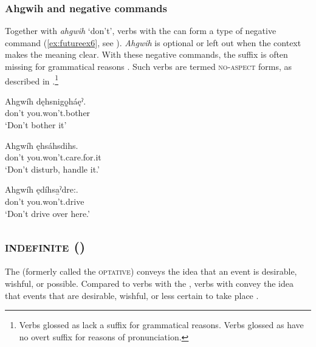 \z
\z


\subsubsection*{Ahgwih  {\future} and negative commands} \label{[ahgwih ę-] future and negative commands}
Together with \textit{ahgwih} ‘don’t’, verbs with the   {\future} can form a type of negative command (\ref{ex:futureex6}, see ). \textit{Ahgwih} is optional or left out when the context makes the meaning clear. With these negative commands, the  {\punctual} suffix is often missing for grammatical reasons . Such verbs are termed \textsc{no-aspect} forms, as described in .\footnote{Verbs glossed as {\noaspect} lack a  {\punctual} suffix for grammatical reasons. Verbs glossed as {\zeropunctual} have no overt  {\punctual} suffix for reasons of pronunciation.}

\ea\label{ex:futureex6} 
\ea\label{ex:futureex6a} 
\gll Ahgwíh dęhsnigǫ̱háęˀ. \\
don’t you.won’t.bother\\
\glt ‘Don’t bother it’

\ex\label{ex:futureex6b} 
\gll Ahgwíh ęhsáhsdihs. \\
don’t you.won’t.care.for.it \\
\glt ‘Don’t disturb, handle it.’

\ex\label{ex:futureex6c} 
\gll Ahgwíh ędíhsa̱ˀdre:. \\
don’t you.won’t.drive \\
\glt ‘Don’t drive over here.’
\z
\z


\largerpage
\subsection{ \textsc{indefinite} ({\indefinite})} \label{[a:-] indefinite prefix}
The  {\indefinite} (formerly called the \textsc{optative}) conveys the idea that an event is desirable, wishful, or possible. Compared to verbs with the  {\future} , verbs with  {\indefinite} convey the idea that events that are desirable, wishful, or less certain to take place .

